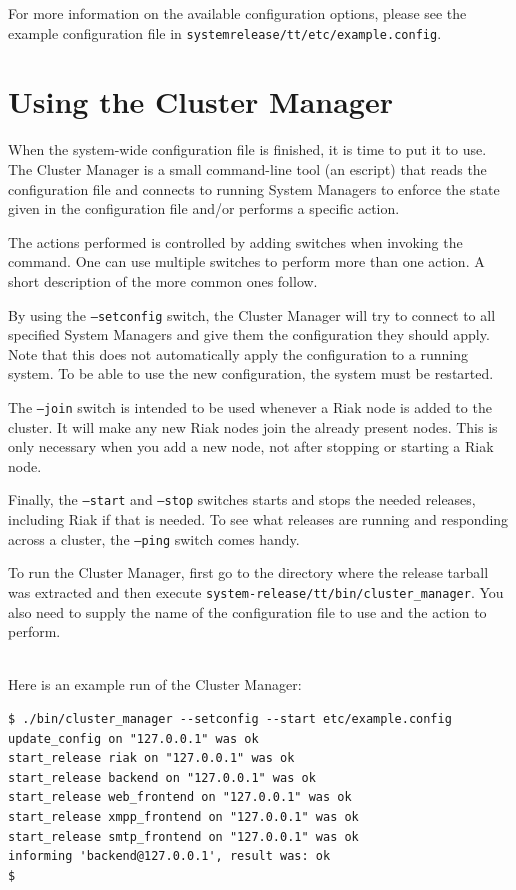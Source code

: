 \documentclass[11pt,a4paper]{report}
\begin{document}
\begin{sloppypar}
For more information on the available configuration options, please see the
example configuration file in {\tt system\-release/tt/etc/example.config}.
\end{sloppypar}
\section{Using the Cluster Manager}
When the system-wide configuration file is finished, it is time to put it to
use. The Cluster Manager is a small command-line tool (an escript) that reads
the configuration file and connects to running System Managers to enforce the
state given in the configuration file and/or performs a specific action.

The actions performed is controlled by adding switches when invoking the
command. One can use multiple switches to perform more than one action. A short
description of the more common ones follow.

By using the {\tt --setconfig} switch, the Cluster Manager will try to connect
to all specified System Managers and give them the configuration they should
apply. Note that this does not automatically apply the configuration to a
running system. To be able to use the new configuration, the system must be
restarted.

The {\tt --join} switch is intended to be used whenever a Riak node is added to
the cluster. It will make any new Riak nodes join the already present
nodes. This is only necessary when you add a new node, not after stopping or
starting a Riak node.

Finally, the {\tt --start} and {\tt --stop} switches starts and stops the needed
releases, including Riak if that is needed. To see what releases are running and
responding across a cluster, the {\tt--ping} switch comes handy.

\begin{sloppypar}
To run the Cluster Manager, first go to the directory where the release tarball
was extracted and then execute {\tt system-release/tt/bin/cluster\_manager}. You
also need to supply the name of the configuration file to use and the action to
perform.
\end{sloppypar}
\mbox{}\\
Here is an example run of the Cluster Manager:
\begin{verbatim}
$ ./bin/cluster_manager --setconfig --start etc/example.config
update_config on "127.0.0.1" was ok
start_release riak on "127.0.0.1" was ok
start_release backend on "127.0.0.1" was ok
start_release web_frontend on "127.0.0.1" was ok
start_release xmpp_frontend on "127.0.0.1" was ok
start_release smtp_frontend on "127.0.0.1" was ok
informing 'backend@127.0.0.1', result was: ok
$
\end{verbatim}
\end{document}
